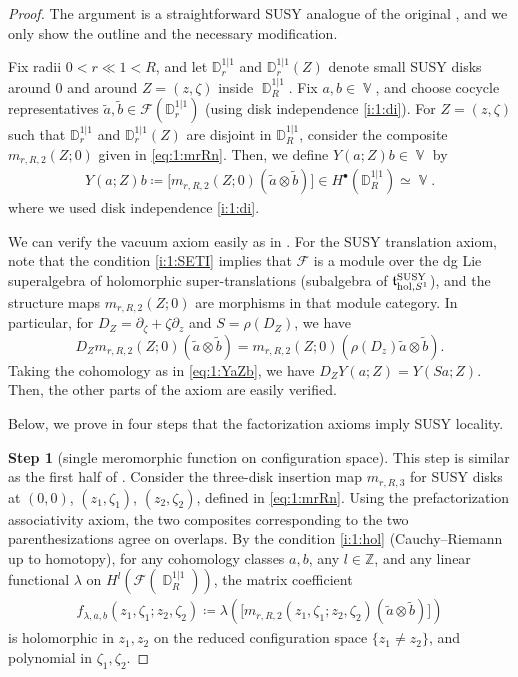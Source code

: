 \documentclass[final,reqno]{amsart}
\numberwithin{equation}{section}
\theoremstyle{definition}
\newcommand{\bl}{\bullet}
\newcommand{\wt}{\widetilde}
\newcommand{\ceq}{\coloneqq} %
\newcommand{\hol}{\textup{hol}}
\newcommand{\SUSY}{\textup{SUSY}}
\newcommand{\bbZ}{\mathbb{Z}}
\newcommand{\sD}{\mathbb{D}^{1|1}}
\newcommand{\clF}{\mathcal{F}}
\newcommand{\frt}{\mathfrak{t}}
\newcommand{\pd}{\partial}
\DeclareMathOperator{\bbD}{\mathbb{D}}
\DeclareMathOperator{\bbV}{\mathbb{V}}
\DeclareMathOperator{\Conf}{Conf}
\begin{document}
\begin{proof}
The argument is a straightforward SUSY analogue of 
the original \cite[Theorem 5.3.3]{CG1}, 
and we only show the outline and the necessary modification.

Fix radii $0 < r \ll 1 < R$, and let $\sD_r$ and $\sD_r(Z)$ denote 
small SUSY disks around $0$ and around $Z=(z,\zeta)$ inside $\bbD_R^{1|1}$.
Fix $a,b \in \bbV$, and choose cocycle representatives 
$\wt{a},\wt{b} \in \clF(\sD_r)$ (using disk independence \ref{i:1:di}).
For $Z=(z,\zeta)$ such that $\sD_r$ and $\sD_r(Z)$ are disjoint in $\sD_R$,
consider the composite $m_{r,R,2}(Z;0)$ 
given in \eqref{eq:1:mrRn}.
Then, we define $Y(a;Z)b \in \bbV$ by  
\begin{align}\label{eq:1:YaZb}
 Y(a;Z)b \ceq \bigl[m_{r,R,2}(Z;0)(\wt{a} \otimes \wt{b})\bigr]
 \in H^{\bl}\!(\sD_R) \simeq \bbV.
\end{align}
where we used disk independence \ref{i:1:di}.

We can verify the vacuum axiom easily as in \cite[\S5.3.4, p.166]{CG1}.
For the SUSY translation axiom, note that the condition \ref{i:1:SETI} 
implies that $\clF$ is a module over the dg Lie superalgebra of 
holomorphic super-translations (subalgebra of $\frt^{\SUSY}_{\hol,S^1}$), 
and the structure maps $m_{r,R,2}(Z;0)$ are morphisms in that module category.
In particular, for $D_Z=\pd_\zeta+\zeta\pd_z$ and $S=\rho(D_Z)$, we have
\[ 
 D_Z m_{r,R,2}(Z;0)(\wt{a} \otimes \wt{b}) = 
 m_{r,R,2}(Z;0)(\rho(D_z)\wt{a} \otimes \wt{b}).
\]
Taking the cohomology as in \eqref{eq:1:YaZb}, we have $D_ZY(a;Z)=Y(Sa;Z)$.
Then, the other parts of the axiom are easily verified.

Below, we prove in four steps that the factorization axioms imply SUSY locality.

\smallskip\noindent
\textbf{Step 1} (single meromorphic function on configuration space). 
This step is similar as the first half of \cite[Proof of Proposition 5.3.6]{CG1}.
Consider the three-disk insertion map
$m_{r,R,3}$ for SUSY disks at $(0,0)$, $(z_1,\zeta_1)$, $(z_2,\zeta_2)$,
defined in \eqref{eq:1:mrRn}.
Using the prefactorization associativity axiom, 
the two composites corresponding to the two parenthesizations agree on overlaps.
By the condition \ref{i:1:hol} (Cauchy--Riemann up to homotopy), 
for any cohomology classes $a,b$, any $l\in\bbZ$, and any linear functional 
$\lambda$ on $H^{l}(\clF(\bbD_R^{1|1}))$, the matrix coefficient
\begin{align}\label{eq:1:flab}
 f_{\lambda,a,b}(z_1,\zeta_1;z_2,\zeta_2) \ceq 
 \lambda\!\left(
 \bigl[m_{r,R,2}(z_1,\zeta_1;z_2,\zeta_2)(\wt{a} \otimes \wt{b})\bigr]\right)
\end{align}
is holomorphic in $z_1,z_2$ on the reduced configuration space $\{z_1\ne z_2\}$,
and polynomial in $\zeta_1,\zeta_2$.


\end{proof}
\end{document}
